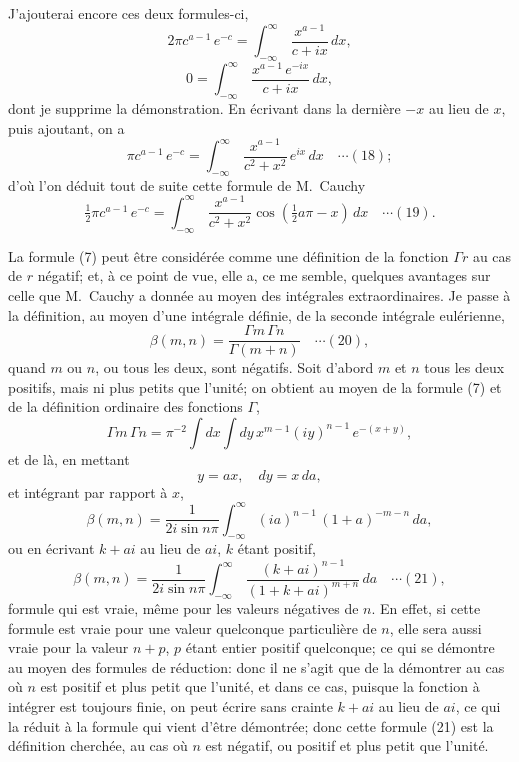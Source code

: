 \documentclass[12pt,a4paper]{article}
\begin{document}
J'ajouterai encore ces deux formules-ci,
\[
2\pi c^{a-1}\,e^{-c} = \int_{-\infty}^{\infty}\,\frac{x^{a-1}}{c + ix}\,dx,
\]
\[
0 = \int_{-\infty}^{\infty}\,\frac{x^{a-1}\,e^{-ix}}{c + ix}\,dx,
\]
dont je supprime la d\'emonstration. En \'ecrivant dans la derni\`ere $-x$ au lieu de $x$, puis ajoutant, on a
\[
\pi c^{a-1}\,e^{-c} = \int_{-\infty}^{\infty}\,\frac{x^{a-1}}{c^2 + x^2}\,e^{ix}\,dx \quad\cdots(18);
\]
d'o\`u l'on d\'eduit tout de suite cette formule de M.\ Cauchy
\[
\tfrac12 \pi c^{a-1}\,e^{-c} = \int_{-\infty}^{\infty}\,\frac{x^{a-1}}{c^2 + x^2}\cos(\tfrac12 a\pi - x)\,dx \quad\cdots(19).
\]

La formule (7) peut \^etre consid\'er\'ee comme une d\'efinition de la fonction $\Gamma r$ au cas de $r$ n\'egatif; et, \`a ce point de vue, elle a, ce me semble, quelques avantages sur celle que M.\ Cauchy a donn\'ee au moyen des int\'egrales extraordinaires. Je passe \`a la d\'efinition, au moyen d'une int\'egrale d\'efinie, de la seconde int\'egrale eul\'erienne,
\[
\beta(m, n) = \frac{\Gamma m\,\Gamma n}{\Gamma(m + n)} \quad\cdots(20),
\]
quand $m$ ou $n$, ou tous les deux, sont n\'egatifs. Soit d'abord $m$ et $n$ tous les deux positifs, mais ni plus petits que l'unit\'e; on obtient au moyen de la formule (7) et de la d\'efinition ordinaire des fonctions $\Gamma$,
\[
\Gamma m\,\Gamma n = \pi^{-2}\int dx \int dy\,x^{m-1}(iy)^{n-1}\,e^{-(x+y)},
\]
et de l\`a, en mettant
\[
y = ax,\quad dy = x\,da,
\]
et int\'egrant par rapport \`a $x$,
\[
\beta(m, n) = \frac{1}{2i\sin n\pi}\int_{-\infty}^{\infty}(ia)^{n-1}\,(1 + a)^{-m-n}\,da,
\]
ou en \'ecrivant $k + ai$ au lieu de $ai$, $k$ \'etant positif,
\[
\beta(m, n) = \frac{1}{2i\sin n\pi}\int_{-\infty}^{\infty}\,\frac{(k + ai)^{n-1}}{(1 + k + ai)^{m+n}}\,da \quad\cdots(21),
\]
formule qui est vraie, m\^eme pour les valeurs n\'egatives de $n$. En effet, si cette formule est vraie pour une valeur quelconque particuli\`ere de $n$, elle sera aussi vraie pour la valeur $n + p$, $p$ \'etant entier positif quelconque; ce qui se d\'emontre au moyen des formules de r\'eduction: donc il ne s'agit que de la d\'emontrer au cas o\`u $n$ est positif et plus petit que l'unit\'e, et dans ce cas, puisque la fonction \`a int\'egrer est toujours finie, on peut \'ecrire sans crainte $k + ai$ au lieu de $ai$, ce qui la r\'eduit \`a la formule qui vient d'\^etre d\'emontr\'ee; donc cette formule (21) est la d\'efinition cherch\'ee, au cas o\`u $n$ est n\'egatif, ou positif et plus petit que l'unit\'e.
\end{document}
